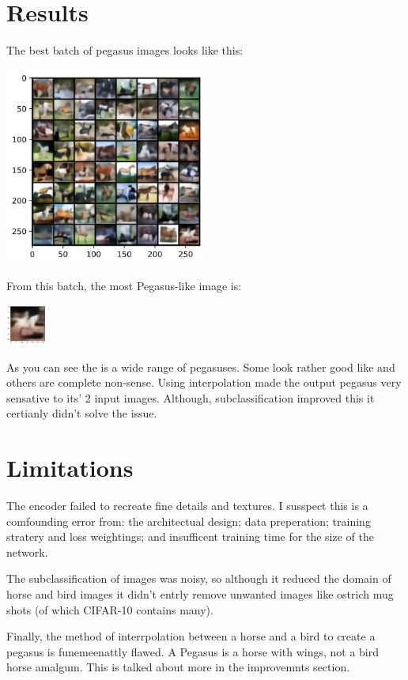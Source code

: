 \documentclass{article}
\begin{document}
\section{Results}
The best batch of pegasus images looks like this:
\begin{center}
    \includegraphics[width=0.5\textwidth]{figures/kinda_allright64.png}
\end{center}
From this batch, the most Pegasus-like image is:
\begin{center}
    \includegraphics[width=0.1\textwidth]{figures/kinda_allright1.png}
\end{center}

As you can see the is a wide range of pegasuses. Some look rather good like and others are complete non-sense. Using interpolation made the output pegasus very sensative to its' 2 input images. Although, subclassification improved this it certianly didn't solve the issue.  

\section{Limitations}
The encoder failed to recreate fine details and textures. I susspect this is a comfounding error from: the architectual design; data preperation; training stratery and loss weightings; and insufficent training time for the size of the network.

The subclassification of images was noisy, so although it reduced the domain of horse and bird images it didn't entrly remove unwanted images like ostrich mug shots (of which CIFAR-10 contains many). 

Finally, the method of interrpolation between a horse and a bird to create a pegasus is funemeenattly flawed. A Pegasus is a horse with wings, not a bird horse amalgum. This is talked about more in the improvemnts section.  
\end{document}
